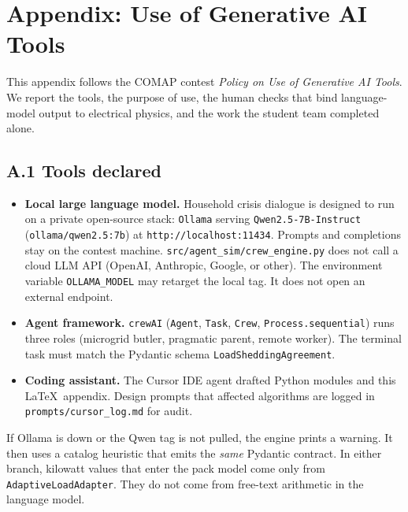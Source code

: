 
\section*{Appendix: Use of Generative AI Tools}
\label{app:ai-disclosure}

This appendix follows the COMAP contest
\emph{Policy on Use of Generative AI Tools}. We report the tools, the
purpose of use, the human checks that bind language-model output to
electrical physics, and the work the student team completed alone.

\subsection*{A.1 Tools declared}

\begin{itemize}
  \item \textbf{Local large language model.}
        Household crisis dialogue is designed to run on a private
        open-source stack: \texttt{Ollama} serving
        \texttt{Qwen2.5-7B-Instruct} (\texttt{ollama/qwen2.5:7b}) at
        \texttt{http://localhost:11434}.
        Prompts and completions stay on the contest machine.
        \texttt{src/agent\_sim/crew\_engine.py} does not call a cloud
        LLM API (OpenAI, Anthropic, Google, or other).
        The environment variable \texttt{OLLAMA\_MODEL} may retarget
        the local tag. It does not open an external endpoint.
  \item \textbf{Agent framework.}
        \texttt{crewAI} (\texttt{Agent}, \texttt{Task}, \texttt{Crew},
        \texttt{Process.sequential}) runs three roles
        (microgrid butler, pragmatic parent, remote worker).
        The terminal task must match the Pydantic schema
        \texttt{LoadSheddingAgreement}.
  \item \textbf{Coding assistant.}
        The Cursor IDE agent drafted Python modules and this
        \LaTeX\ appendix. Design prompts that affected algorithms are
        logged in \texttt{prompts/cursor\_log.md} for audit.
\end{itemize}

If Ollama is down or the Qwen tag is not pulled, the engine prints a
warning. It then uses a catalog heuristic that emits the \emph{same}
Pydantic contract. In either branch, kilowatt values that enter the
pack model come only from \texttt{AdaptiveLoadAdapter}. They do not
come from free-text arithmetic in the language model.

